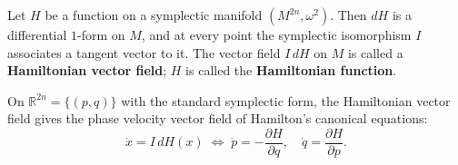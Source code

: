 Let $H$ be a function on a symplectic manifold $(M^{2n}, \omega^2)$. Then $dH$ is a differential $1$-form on $M$, and at every point the symplectic isomorphism $I$ associates a tangent vector to it. The vector field $I\,dH$ on $M$ is called a \textbf{Hamiltonian vector field}; $H$ is called the \textbf{Hamiltonian function}.

On $\mathbb{R}^{2n} = \{(p, q)\}$ with the standard symplectic form, the Hamiltonian vector field gives the phase velocity vector field of Hamilton's canonical equations:
$$
\dot{x} = I\,dH(x) \;\Leftrightarrow\; \dot{p} = -\frac{\partial H}{\partial q}, \quad \dot{q} = \frac{\partial H}{\partial p}.
$$

